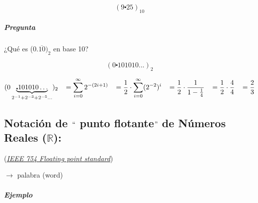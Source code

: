 $$
(9\centerdot25)_{10}
$$

\subparagraph{Pregunta}
\begin{center}
¿Qué es (0.$\overline{10})_{2}$ en base 10?
\end{center}

$$
(0{\centerdot101010...})_{2}
$$

\vspace{3mm}

$$
(0\underbrace{\centerdot101010\ldots}_{2^{-1} + 2^{-3} + 2^{-5}\ldots})_{2} \hspace{3mm} = \sum_{i=0}^{\infty } 2^{-(2i+1)} \hspace{3mm} = \frac{1}{2} \cdot \sum_{i=0}^{\infty } (2^{-2})^i \hspace{3mm} = \frac{1}{2} \cdot \frac{1}{1-\frac{1}{4}} \hspace{3mm} = \frac{1}{2} \cdot \frac{4}{4} \hspace{3mm} = \frac{2}{3}
$$


\subsection{Notación de $``$ punto flotante$"$ de Números Reales ($\mathbb{R}$):}
\begin{center}
(\emph{\underline{IEEE 754 Floating point standard}})
\end{center}
\begin{center}
\begin{large}
 $\rightarrow$ palabra (word)
\end{large}
\end{center} 

\subparagraph{Ejemplo}

